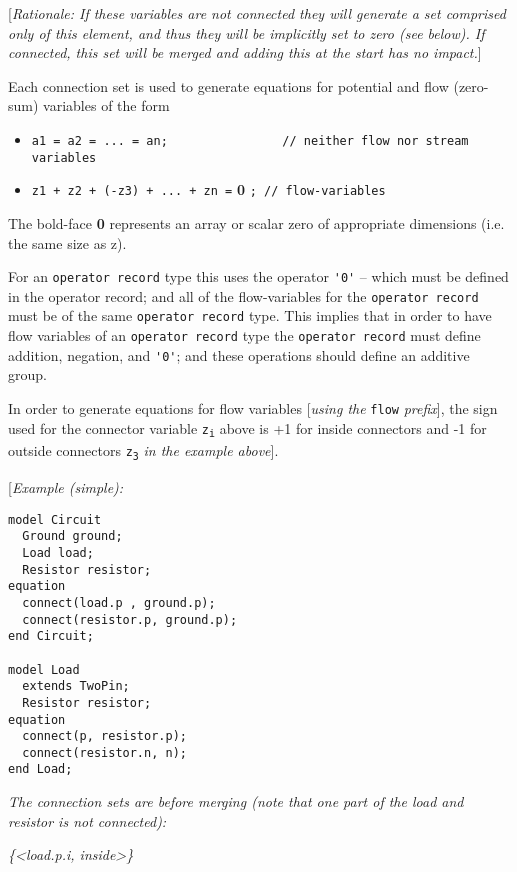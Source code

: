 {[}\emph{Rationale: If these variables are not connected they will
generate a set comprised only of this element, and thus they will be
implicitly set to zero (see below). If connected, this set will be
merged and adding this at the start has no impact.}{]}

Each connection set is used to generate equations for potential and flow
(zero-sum) variables of the form

\begin{itemize}
\item
\lstinline!a1 = a2 = ... = an;                // neither flow nor stream variables!
\item
\lstinline!z1 + z2 + (-z3) + ... + zn =! \small{\textbf{0}} \lstinline!; // flow-variables!
\end{itemize}

The bold-face \textbf{0} represents an array or scalar zero of
appropriate dimensions (i.e. the same size as z).

For an \lstinline!operator record! type this uses the operator \lstinline!'0'! -- which must be
defined in the operator record; and all of the flow-variables for the
\lstinline!operator record! must be of the same \lstinline!operator record! type. This implies
that in order to have flow variables of an \lstinline!operator record! type the
\lstinline!operator record! must define addition, negation, and \lstinline!'0'!; and these
operations should define an additive group.

In order to generate equations for flow variables {[}\emph{using the}
\lstinline!flow! \emph{prefix}{]}, the sign used for the connector variable
\texttt{z\textsubscript{i}} above is +1 for inside connectors and -1 for outside
connectors \texttt{z\textsubscript{3}} \emph{in the example above}{]}.

{[}\emph{Example (simple):}

\begin{lstlisting}[language=modelica]
model Circuit
  Ground ground;
  Load load;
  Resistor resistor;
equation
  connect(load.p , ground.p);
  connect(resistor.p, ground.p);
end Circuit;

model Load
  extends TwoPin;
  Resistor resistor;
equation
  connect(p, resistor.p);
  connect(resistor.n, n);
end Load;
\end{lstlisting}
\emph{The connection sets are before merging (note that one part of the
load and resistor is not connected):}

\emph{\{\textless{}load.p.i, inside\textgreater{}\}}

